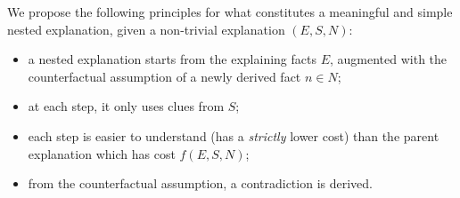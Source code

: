 







We propose the following principles for what constitutes a meaningful and simple nested explanation, given a non-trivial explanation $(E,S,N)$:
\begin{itemize}
 \item a nested explanation starts from the explaining facts $E$, %
 augmented with the counterfactual assumption of a newly derived fact $n \in N$; 
 \item at each step, it only uses clues from $S$;
 \item each step is easier to understand (has a \emph{strictly} lower cost) than the parent explanation which has cost $f(E,S,N)$;
 \item from the counterfactual assumption, a contradiction is derived. %
\end{itemize}

